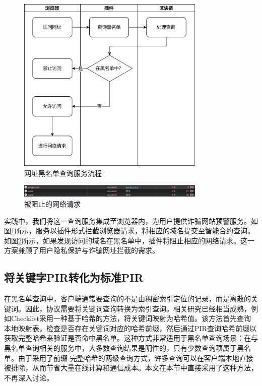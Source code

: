 \begin{figure}
    \centering
    \includegraphics[width=0.8\textwidth]{figure/浏览器逻辑.png}
    \caption{网址黑名单查询服务流程}
    \label{fig:pir-application-browser}
\end{figure}


\begin{figure}
    \centering
    \includegraphics[width=0.8\textwidth]{figure/blocking_requests.png}
    \caption{被阻止的网络请求}
    \label{fig:blocking-requests}
\end{figure}
实践中，我们将这一查询服务集成至浏览器内，为用户提供诈骗网站预警服务。如图\ref{fig:pir-application-browser}所示，服务以插件形式拦截浏览器请求，将相应的域名提交至智能合约查询。如图\ref{fig:blocking-requests}所示，如果发现访问的域名在黑名单中，插件将阻止相应的网络请求。这一方案兼顾了用户隐私保护与诈骗网址拦截的需求。



\subsection{将关键字PIR转化为标准PIR}
在黑名单查询中，客户端通常要查询的不是由稠密索引定位的记录，而是离散的关键词。因此，协议需要将关键词查询转换为索引查询。相关研究已经相当成熟，例如Checklist\cite{USENIX:KogCor21}采用一种基于哈希的方法，将关键词映射为哈希值。该方法首先查询本地映射表，检查是否存在关键词对应的哈希前缀，然后通过PIR查询哈希前缀以获取完整哈希来验证是否命中黑名单。这种方式非常适用于黑名单查询场景：在与黑名单查询相关的服务中，大多数查询结果是阴性的，只有少数查询项属于黑名单。由于采用了前缀-完整哈希的两级查询方式，许多查询可以在客户端本地直接被排除，从而节省大量在线计算和通信成本。本文在本节中直接采用了这种方法，不再深入讨论。